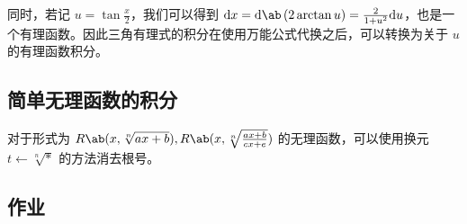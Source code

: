 同时，若记 $u = \tan \frac{x}{2}$，我们可以得到 $\dd x = \dd \ab(2 \arctan u) = \frac{2}{1 + u^2} \dd u$，也是一个有理函数。因此三角有理式的积分在使用万能公式代换之后，可以转换为关于 $u$ 的有理函数积分。

\subsection{简单无理函数的积分}

对于形式为 $R\ab(x, \sqrt[n]{ax + b}), R\ab(x, \sqrt[n]{\frac{ax + b}{cx + e}})$ 的无理函数，可以使用换元 $t \gets \sqrt[n]{*}$ 的方法消去根号。

\subsection{作业}

